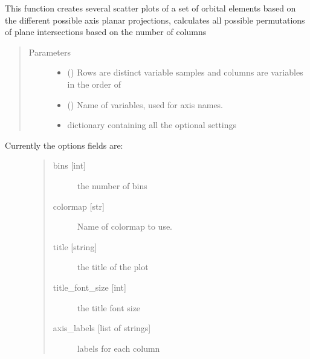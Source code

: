 \documentclass[letterpaper,10pt,english]{sphinxmanual}
\begin{document}
\begin{fulllineitems}
\label{\detokenize{modules/dpt_tools:dpt_tools.posterior}}
This function creates several scatter plots of a set of orbital elements based on the
different possible axis planar projections, calculates all possible permutations of plane
intersections based on the number of columns
\begin{quote}\begin{description}
\item[{Parameters}] \leavevmode\begin{itemize}
\item {} 
 () \textendash{} Rows are distinct variable samples and columns are variables in the order of 

\item {} 
 () \textendash{} Name of variables, used for axis names.

\item {} 
 \textendash{} dictionary containing all the optional settings

\end{itemize}

\end{description}\end{quote}
\begin{description}
\item[{Currently the options fields are:}] \leavevmode\begin{quote}\begin{description}
\item[{bins {[}int{]}}] \leavevmode
the number of bins

\item[{colormap {[}str{]}}] \leavevmode
Name of colormap to use.

\item[{title {[}string{]}}] \leavevmode
the title of the plot

\item[{title\_font\_size {[}int{]}}] \leavevmode
the title font size

\item[{axis\_labels {[}list of strings{]}}] \leavevmode
labels for each column


\end{description}
\end{quote}
\end{description}
\end{fulllineitems}
\end{document}
